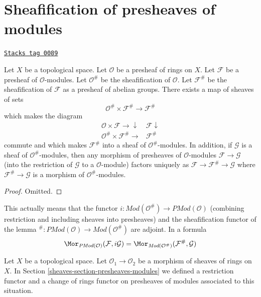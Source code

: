 \section{Sheafification of presheaves of modules}
\label{sheaves-section-sheafification-presheaves-modules}
\begin{lemma}
\label{sheaves-lemma-sheafification-presheaf-modules}
\href{https://stacks.math.columbia.edu/tag/0089}{\texttt{Stacks tag 0089}}

Let $X$ be a topological space.
Let $\mathcal{O}$ be a presheaf of rings on $X$.
Let $\mathcal{F}$ be a presheaf of $\mathcal{O}$-modules.
Let $\mathcal{O}^\#$ be the sheafification of $\mathcal{O}$.
Let $\mathcal{F}^\#$ be the sheafification of $\mathcal{F}$
as a presheaf of abelian groups. There exists a map of
sheaves of sets
$$
\mathcal{O}^\# \times \mathcal{F}^\#
\longrightarrow
\mathcal{F}^\#
$$
which makes the diagram
$$
\begin{array}{cc}\mathcal{O} \times \mathcal{F} \longrightarrow\downarrow & \mathcal{F} \downarrow \\ \mathcal{O}^\# \times \mathcal{F}^\# \longrightarrow & \mathcal{F}^\#\end{array}
$$
commute and which makes $\mathcal{F}^\#$ into a sheaf
of $\mathcal{O}^\#$-modules. In addition, if $\mathcal{G}$
is a sheaf of $\mathcal{O}^\#$-modules, then any morphism
of presheaves of $\mathcal{O}$-modules $\mathcal{F} \to \mathcal{G}$
(into the restriction of $\mathcal{G}$ to a $\mathcal{O}$-module)
factors uniquely as $\mathcal{F} \to \mathcal{F}^\# \to \mathcal{G}$
where $\mathcal{F}^\# \to \mathcal{G}$ is a morphism of
$\mathcal{O}^\#$-modules.
\end{lemma}

\begin{proof}
Omitted.
\end{proof}

This actually means that the functor
$i : \textit{Mod}(\mathcal{O}^\#) \to \textit{PMod}(\mathcal{O})$
(combining restriction and including sheaves into presheaves)
and the sheafification functor of the lemma
${}^\# : \textit{PMod}(\mathcal{O}) \to \textit{Mod}(\mathcal{O}^\#)$
are adjoint. In a formula
$$
\Mor_{\textit{PMod}(\mathcal{O})}(\mathcal{F}, i\mathcal{G})
=
\Mor_{\textit{Mod}(\mathcal{O}^\#)}(\mathcal{F}^\#, \mathcal{G})
$$

\medskip\noindent
Let $X$ be a topological space.
Let $\mathcal{O}_1 \to \mathcal{O}_2$ be
a morphism of sheaves of rings on $X$.
In Section \ref{sheaves-section-presheaves-modules}
we defined a restriction functor
and a change of rings functor on presheaves of modules
associated to this situation.

